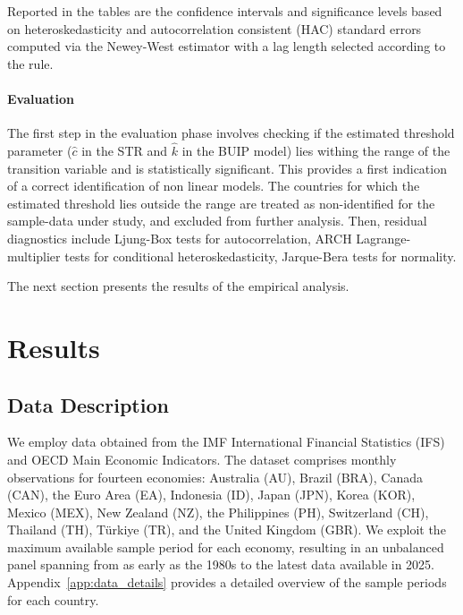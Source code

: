 \documentclass[a4paper,10pt,final]{article}    %
\begin{document}
Reported in the tables are the confidence intervals and significance levels based on heteroskedasticity and autocorrelation consistent (HAC) standard errors computed via the Newey-West estimator with a lag length selected according to the \citet{newey1994automatic} rule.

\paragraph{Evaluation}
The first step in the evaluation phase involves checking if the estimated threshold parameter ($\hat{c}$ in the STR and $\hat{k}$ in the BUIP model) lies withing the range of the transition variable and is statistically significant. This provides a first indication of a correct identification of non linear models. The countries for which the estimated threshold lies outside the range are treated as non-identified for the sample-data under study, and excluded from further analysis.
Then, residual diagnostics include Ljung-Box tests for autocorrelation, ARCH Lagrange-multiplier tests for conditional heteroskedasticity, Jarque-Bera tests for normality.

The next section presents the results of the empirical analysis.

\section{Results}
\label{chap:results}

\subsection{Data Description}
\label{chap:data}

We employ data obtained from the IMF International Financial Statistics (IFS) and OECD Main Economic Indicators. The dataset comprises monthly observations for fourteen economies: Australia (AU), Brazil (BRA), Canada (CAN), the Euro Area (EA), Indonesia (ID), Japan (JPN), Korea (KOR), Mexico (MEX), New Zealand (NZ), the Philippines (PH), Switzerland (CH), Thailand (TH), Türkiye (TR), and the United Kingdom (GBR). We exploit the maximum available sample period for each economy, resulting in an unbalanced panel spanning from as early as the 1980s to the latest data available in 2025. Appendix~\ref{app:data_details} provides a detailed overview of the sample periods for each country.
\end{document}
